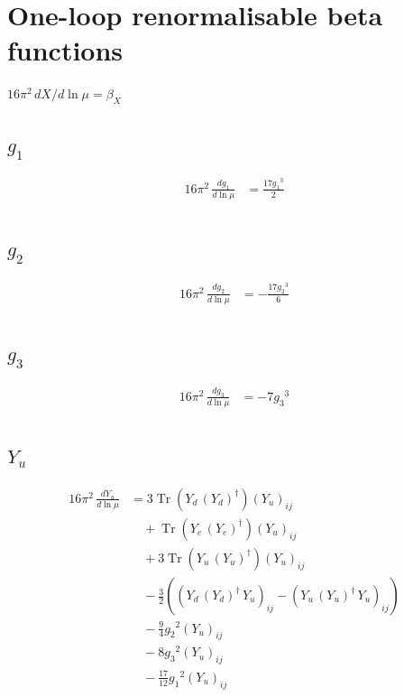 \documentclass[10pt,a4paper]{article}
\begin{document}
\section*{One-loop renormalisable beta functions}
$16\pi^2\,dX/d\ln\mu=\beta_X$
\subsection*{$g_1$}
\begin{align*}
16\pi^2\,\frac{d g_1}{d\ln\mu} &=\frac{17 {g_1}^3}{2} \\
\end{align*}
\subsection*{$g_2$}
\begin{align*}
16\pi^2\,\frac{d g_2}{d\ln\mu} &=-\frac{17 {g_2}^3}{6} \\
\end{align*}
\subsection*{$g_3$}
\begin{align*}
16\pi^2\,\frac{d g_3}{d\ln\mu} &=-7 {g_3}^3 \\
\end{align*}
\subsection*{$Y_u$}
\begin{align*}
16\pi^2\,\frac{d Y_u}{d\ln\mu} &=3 \operatorname{Tr}\!\left({Y_d}\,\left({Y_d}\right)^{\dagger}\right) \left({Y_u}\right)_{ij} \\
&\quad +\operatorname{Tr}\!\left({Y_e}\,\left({Y_e}\right)^{\dagger}\right) \left({Y_u}\right)_{ij} \\
&\quad +3 \operatorname{Tr}\!\left({Y_u}\,\left({Y_u}\right)^{\dagger}\right) \left({Y_u}\right)_{ij} \\
&\quad -\frac{3}{2} (\left({Y_d}\,\left({Y_d}\right)^{\dagger}\,{Y_u}\right)_{ij}-\left({Y_u}\,\left({Y_u}\right)^{\dagger}\,{Y_u}\right)_{ij}) \\
&\quad -\frac{9}{4} {g_2}^2 \left({Y_u}\right)_{ij} \\
&\quad -8 {g_3}^2 \left({Y_u}\right)_{ij} \\
&\quad -\frac{17}{12} {g_1}^2 \left({Y_u}\right)_{ij} \\
\end{align*}
\end{document}
